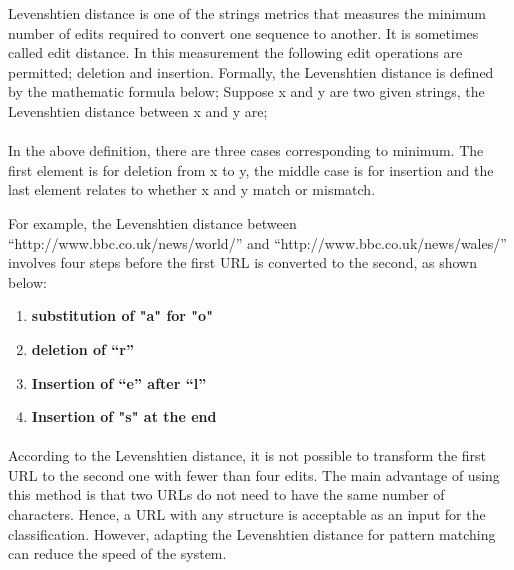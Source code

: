 Levenshtien distance is one of the strings metrics that measures the minimum number of edits required to convert one sequence to another. It is sometimes called edit distance. In this measurement the following edit operations are permitted; deletion and insertion. 
Formally, the Levenshtien distance is defined by the mathematic formula below;
Suppose x and y are two given strings, the Levenshtien distance between x and y are;
%


%

\paragraph{} 
In the above definition, there are three cases corresponding to minimum. The first element is for deletion from x to y, the middle case is for insertion and the last element relates to whether x and y match or mismatch\cite{Levenshtein}.  

For example, the Levenshtien distance between “http://www.bbc.co.uk/news/world/” and “http://www.bbc.co.uk/news/wales/” involves four steps before the first URL is converted to the second, as shown below:
\begin{enumerate}
\item 
{\bf substitution of "a" for "o"}\\
\item
{\bf deletion of “r” }\\
\item
{\bf Insertion of “e” after “l”}\\
\item
{\bf Insertion of "s" at the end}\\
\end{enumerate}

\paragraph{} 
According to the Levenshtien distance, it is not possible to transform the first URL to the second one with fewer than four edits. The main advantage of using this method is that two URLs do not need to have the same number of characters. Hence, a URL with any structure is acceptable as an input for the classification. However, adapting the Levenshtien distance for pattern matching can reduce the speed of the system.

